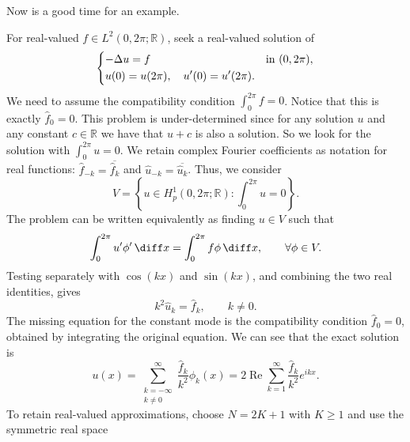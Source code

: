 Now is a good time for an example.
\begin{example}
    \label{ex:Laplace equation by Fourier-Galerkin}
    For real-valued $f\in L^2(0,2\pi;\mathbb R)$, seek a real-valued solution of
    \begin{equation*}
        \begin{dcases}
            -\Delta u = f & \text{in } (0,2\pi), \\
            u(0) = u(2\pi), \quad u'(0) = u'(2\pi).
        \end{dcases}
    \end{equation*}
    We need to assume the compatibility condition $\int_0^{2\pi} f = 0$. Notice that this is exactly $\hat f_0 = 0$.
    This problem is under-determined since for any solution $u$ and any constant $c \in \mathbb R$ we have that $u + c$ is also a solution.
    So we look for the solution with $\int_0^{2\pi} u = 0$.
    We retain complex Fourier coefficients as notation for real functions: $\hat f_{-k}=\overline{\hat f_k}$ and $\hat u_{-k}=\overline{\hat u_k}$.
    Thus, we consider
    \begin{equation*}
        V = \left\{ u \in H^1_p(0,2\pi;\mathbb R) : \int_0^{2\pi} u = 0 \right\}.
    \end{equation*}
    The problem can be written equivalently as finding $u \in V$ such that
    \begin{equation*}
        \int_0^{2\pi}u'\phi'\,\diff x = \int_0^{2\pi}f\phi\,\diff x, \qquad \forall \phi \in V.
    \end{equation*}
    Testing separately with $\cos(kx)$ and $\sin(kx)$, and combining the two real identities, gives
    \begin{equation*}
        k^2 \hat u_k = \hat f_k, \qquad k\ne0.
    \end{equation*}
    The missing equation for the constant mode is the compatibility condition $\hat f_0=0$, obtained by integrating the original equation.
    We can see that the exact solution is
    \begin{equation*}
        u(x) = \sum_{\substack{k=-\infty \\ k \ne 0}}^\infty \frac{\hat f_k}{k^2} \phi_k(x)
        = 2\operatorname{Re}\sum_{k=1}^\infty\frac{\hat f_k}{k^2}e^{ikx}.
    \end{equation*}
    To retain real-valued approximations, choose $N=2K+1$ with $K\ge1$ and use the symmetric real space
    \begin{equation*}

\end{equation*}
\end{example}
